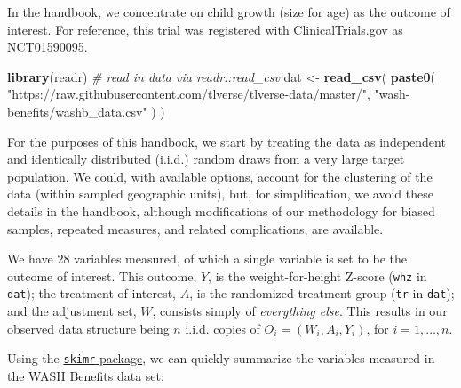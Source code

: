 \documentclass[12pt, krantz2,]{krantz}
\newenvironment{Shaded}{\begin{snugshade}}{\end{snugshade}}
\newcommand{\CommentTok}[1]{\textcolor[rgb]{0.37,0.37,0.37}{\textit{#1}}}
\newcommand{\KeywordTok}[1]{\textcolor[rgb]{0.27,0.27,0.27}{\textbf{#1}}}
\newcommand{\NormalTok}[1]{#1}
\newcommand{\StringTok}[1]{\textcolor[rgb]{0.5,0.5,0.5}{#1}}
\theoremstyle{definition}
\theoremstyle{definition}
\theoremstyle{definition}
\newcommand{\1}{\mathbbm{1}}
\begin{document}
In the handbook, we concentrate on child growth (size for age) as the outcome of
interest. For reference, this trial was registered with ClinicalTrials.gov as
NCT01590095.

\begin{Shaded}
\begin{Highlighting}[]
\KeywordTok{library}\NormalTok{(readr)}
\CommentTok{# read in data via readr::read_csv}
\NormalTok{dat <-}\StringTok{ }\KeywordTok{read_csv}\NormalTok{(}
  \KeywordTok{paste0}\NormalTok{(}
    \StringTok{"https://raw.githubusercontent.com/tlverse/tlverse-data/master/"}\NormalTok{,}
    \StringTok{"wash-benefits/washb_data.csv"}
\NormalTok{  )}
\NormalTok{)}
\end{Highlighting}
\end{Shaded}

For the purposes of this handbook, we start by treating the data as independent
and identically distributed (i.i.d.) random draws from a very large target
population. We could, with available options, account for the clustering of the
data (within sampled geographic units), but, for simplification, we avoid these
details in the handbook, although modifications of our methodology for biased
samples, repeated measures, and related complications, are available.

We have 28 variables measured, of which a single variable is set to
be the outcome of interest. This outcome, \(Y\), is the weight-for-height Z-score
(\texttt{whz} in \texttt{dat}); the treatment of interest, \(A\), is the randomized treatment
group (\texttt{tr} in \texttt{dat}); and the adjustment set, \(W\), consists simply of
\emph{everything else}. This results in our observed data structure being \(n\) i.i.d.
copies of \(O_i = (W_i, A_i, Y_i)\), for \(i = 1, \ldots, n\).

Using the \href{https://CRAN.R-project.org/package=skimr}{\texttt{skimr} package}, we can
quickly summarize the variables measured in the WASH Benefits data set:
\end{document}
